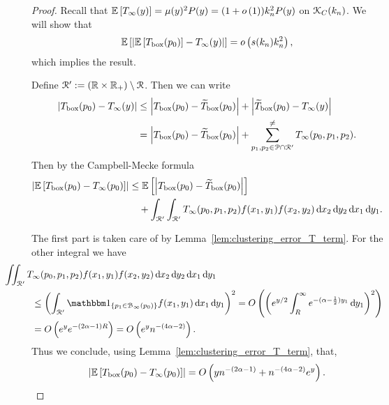 \begin{proof}
Recall that $\mathbb{E}\left[T_\infty(y)\right] = \mu(y)^2 P(y) = (1+o\left(1\right))k_n^2 P(y)$ on ${\mathcal K}_C(k_n)$. We will show that
\[
	\mathbb{E}\left[\left|\mathbb{E}\left[T_{\mathrm{box}}(p_0)\right] - T_\infty(y)\right|\right] = o\left(s(k_n) k_n^2\right),
\]
which implies the result.

Define ${\mathcal R}^\prime := ({\mathbb R} \times {\ensuremath{\mathbb R}}_+) \setminus {\mathcal R}$. Then we can write
\begin{align*}
	\left|T_{\mathrm{box}}(p_0) - T_\infty(y)\right|
	&\le \left|T_{\mathrm{box}}(p_0) - \widetilde{T}_{\text{box}}(p_0)\right| 
		+ \left|\widetilde{T}_{\text{box}}(p_0) - T_\infty(y)\right|\\
	&= \left|T_{\mathrm{box}}(p_0) - \widetilde{T}_{\text{box}}(p_0)\right| 
		+ \sum_{p_1, p_2 \in {\mathcal P} \cap {\mathcal R}^\prime}^{\ne} T_{\infty}(p_0,p_1,p_2).
\end{align*}
Then by the Campbell-Mecke formula
\begin{align*}
	\left|\mathbb{E}\left[T_{\text{box}}(p_0) - T_{\infty}(p_0)\right]\right|
	&\le \mathbb{E}\left[\left|T_{\text{box}}(p_0) - \widetilde{T}_{\text{box}}(p_0)\right|\right]\\
	&\hspace{10pt}+ \int_{{\mathcal R}^\prime}\int_{{\mathcal R}^\prime} T_{\infty}(p_0,p_1,p_2) f(x_1,y_1) f(x_2,y_2)
		\operatorname{\mathrm{d}\hspace{-2pt}} x_2 \operatorname{\mathrm{d}\hspace{-2pt}} y_2 \operatorname{\mathrm{d}\hspace{-2pt}} x_1 \operatorname{\mathrm{d}\hspace{-2pt}} y_1. 
\end{align*}

The first part is taken care of by Lemma~\ref{lem:clustering_error_T_term}. For the other integral we have
\begin{align*}
	&\hspace{-30pt}\iint_{\Rcal^\prime} T_{\infty}(p_0,p_1,p_2) f(x_1,y_1) f(x_2,y_2)
		\dd x_2 \dd y_2 \dd x_1 \dd y_1\\
	&\le \left(\int_{\Rcal^\prime} \ind{p_1 \in \BallPo{p_0}} f(x_1,y_1) \dd x_1 \dd y_1\right)^2
		= \bigO{\left(e^{y/2} \int_{R}^\infty e^{-(\alpha - \frac{1}{2})y_1} \dd y_1\right)^2}\\
	&= \bigO{e^{y} e^{-(2\alpha-1)R}} = \bigO{e^y n^{-(4\alpha - 2)}}.
\end{align*}
Thus we conclude, using Lemma~\ref{lem:clustering_error_T_term}, that,
\begin{equation}\label{eq:triangle_count_diff_scaling}
	\left|\mathbb{E}\left[T_{\text{box}}(p_0) - T_{\infty}(p_0)\right]\right| = O\left(y n^{-(2\alpha - 1)} + n^{-(4\alpha-2)} e^{y}\right).
\end{equation}


\end{proof}
